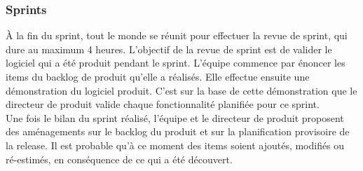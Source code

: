 \subsubsection*{Sprints}
À la fin du sprint, tout le monde se réunit pour effectuer la revue de sprint, qui dure au maximum 4
heures. L’objectif de la revue de sprint est de valider le logiciel qui a été produit pendant le sprint.
L’équipe commence par énoncer les items du backlog de produit qu’elle a réalisés. Elle effectue ensuite
une démonstration du logiciel produit. C’est sur la base de cette démonstration que le directeur
de produit valide chaque fonctionnalité planifiée pour ce sprint.\\
Une fois le bilan du sprint réalisé, l’équipe et le directeur de produit proposent des aménagements sur
le backlog du produit et sur la planification provisoire de la release. Il est probable qu’à ce moment
des items soient ajoutés, modifiés ou ré-estimés, en conséquence de ce qui a été découvert.